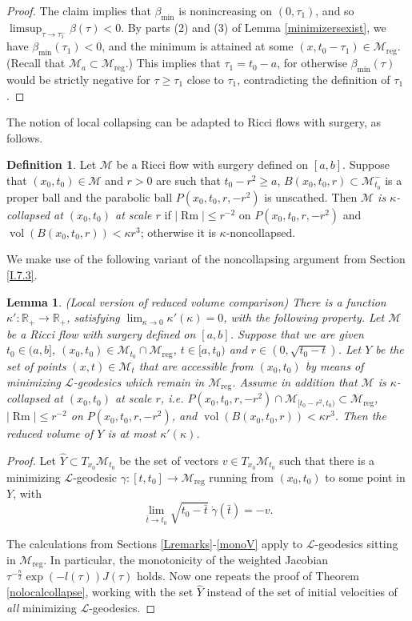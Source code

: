 \documentclass[12pt]{amsart}
\newcommand{\be}{\beta}
\renewcommand{\L}{{\mathcal L}}
\newcommand{\M}{{\mathcal M}}
\newcommand{\R}{{\mathbb R}}
\newcommand{\reg}{\operatorname{reg}}
\newcommand{\Rm}{\operatorname{Rm}}
\newcommand{\vol}{\operatorname{vol}}
\newcommand{\ga}{\gamma}
\newcommand{\ra}{\rightarrow}
\numberwithin{equation}{section}
\theoremstyle{plain}
\newtheorem{lemma}[equation]{Lemma}
\theoremstyle{definition}
\newtheorem{definition}[equation]{Definition}
\theoremstyle{remark}
\begin{document}
\begin{proof}
The claim implies that $\be_{\min}$ is  nonincreasing on $(0,\tau_1)$,
and so 
$\limsup_{\tau\ra \tau_1^-}\be(\tau)<0$.
By parts (2) and (3) of Lemma \ref{minimizersexist},
we have $\be_{\min}(\tau_1)<0$, and the minimum is attained at some  
$(x,{t_0 - \tau_1})\in
\M_{\reg}$.
(Recall that $\M_a \subset \M_{\reg}$.)
This implies that $\tau_1=t_0-a$, for otherwise $\be_{\min}(\tau)$ 
would be strictly negative for $\tau\geq\tau_1 $ close to $\tau_1$, 
contradicting the definition of $\tau_1$.
\end{proof}

The notion of local collapsing can be adapted to Ricci flows with surgery,
as follows.
\begin{definition}
\label{surgerycollapsedef}
Let $\M$ be a Ricci flow with surgery defined on $[a,b]$. Suppose that
$(x_0,t_0)\in\M$ and $r>0$ are such that $t_0-r^2\geq a$, 
$B(x_0,t_0,r)\subset\M_{t_0}^-$ is a proper ball
and the parabolic ball $P(x_0,t_0,r,-r^2)$ is unscathed.
Then {\em $\M$ is $\kappa$-collapsed at $(x_0,t_0)$ at scale
$r$} if $|\Rm|\leq r^{-2}$ on $P(x_0,t_0,r,-r^2)$ and 
$\vol(B(x_0,t_0,r))<\kappa r^3$; otherwise it is $\kappa$-noncollapsed.
\end{definition}

We make use of the following variant of the noncollapsing
argument from Section \ref{I.7.3}.
 
\begin{lemma}(Local version of reduced volume comparison)
\label{localreducedvolume}
There is a function $\kappa':\R_+\ra \R_+$, satisfying
$\lim_{\kappa\ra 0}\kappa'(\kappa)=0$, with the following property.
Let $\M$ be a Ricci flow with surgery defined on $[a,b]$. Suppose
that we are given $t_0\in (a,b]$,
$(x_0,t_0)\in \M_{t_0}\cap \M_{\reg}$, $t\in [a,t_0)$ and
$r \in (0,\sqrt{t_0-t})$.  Let $Y$ be the set of points $(x,t)\in \M_t$
that are accessible from $(x_0,t_0)$ by means of minimizing $\L$-geodesics
which remain in $\M_{\reg}$.  Assume 
in addition that 
$\M$ is $\kappa$-collapsed at $(x_0,t_0)$ at scale $r$, i.e.
$P(x_0,t_0,r,-r^2) \cap \M_{[t_0 - r^2, t_0)} \subset\M_{\reg}$,
$|\Rm|\leq r^{-2}$ on 
$P(x_0,t_0,r,-r^2)$, and $\vol(B(x_0,t_0,r))<\kappa r^3$. 
Then  the reduced volume of $Y$ is at most 
$\kappa'(\kappa)$.
\end{lemma}
\begin{proof}
Let $\hat Y\subset T_{x_0}\M_{t_0}$ be the set of vectors 
$v\in T_{x_0}\M_{t_0}$
such that there is a minimizing $\L$-geodesic $\ga:[t,t_0]\ra \M_{\reg}$
 running from $(x_0,t_0)$ to some point in $Y$, with
\begin{equation}
\lim_{\bar t\ra t_0}\sqrt{t_0-\bar t}\;\dot{\ga}(\bar t)=-v.
\end{equation}

\noindent
The calculations from Sections \ref{Lremarks}-\ref{monoV} 
apply to $\L$-geodesics sitting in $\M_{\reg}$.
In particular, the monotonicity of the weighted Jacobian
$\tau^{-\frac{n}{2}}\exp(-l(\tau))J(\tau)$ holds.  Now one repeats
 the proof of Theorem \ref{nolocalcollapse}, working with the set $\hat Y$
instead of  the set of initial velocities of {\em all} minimizing
$\L$-geodesics. 
\end{proof}
\end{document}
